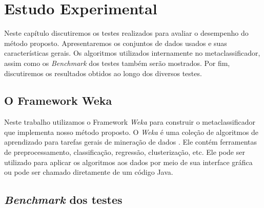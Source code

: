 \chapter{Estudo Experimental}
\label{chap:descricaodostestes}

Neste capítulo discutiremos os testes realizados para avaliar o desempenho do método proposto.
Apresentaremos os conjuntos de dados usados e suas características gerais. 
Os algoritmos utilizados internamente no metaclassificador, assim como os \textit{Benchmark} dos testes também serão mostrados.
Por fim, discutiremos os resultados obtidos ao longo dos diversos testes.

\section{O Framework Weka}

Neste trabalho utilizamos o Framework \textit{Weka} para construir o metaclassificador que implementa nosso método proposto. 
O \textit{Weka} é uma coleção de algoritmos de aprendizado para tarefas gerais de mineração de dados \cite{Hall}.
Ele contém ferramentas de preprocessamento, classificação, regressão, clusterização, etc.
Ele pode ser utilizado para aplicar os algoritmos aos dados por meio de sua interface gráfica ou pode ser chamado diretamente de um código Java.

\section{\textit{Benchmark} dos testes}

